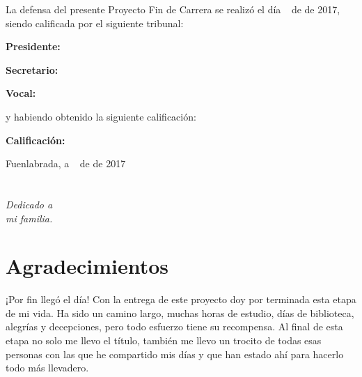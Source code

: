 \documentclass[a4paper, 12pt]{book}
\begin{document}
\vspace{1cm}
La defensa del presente Proyecto Fin de Carrera se realizó el día \qquad$\;\,$ de \qquad\qquad\qquad\qquad \newline de 2017, siendo calificada por el siguiente tribunal:


\vspace{0.5cm}
\textbf{Presidente:}

\vspace{1.2cm}
\textbf{Secretario:}

\vspace{1.2cm}
\textbf{Vocal:}


\vspace{1.2cm}
y habiendo obtenido la siguiente calificación:

\vspace{1cm}
\textbf{Calificación:}


\vspace{1cm}
\begin{flushright}
Fuenlabrada, a \qquad$\;\,$ de \qquad\qquad\qquad\qquad de 2017
\end{flushright}


\chapter*{}
\begin{flushright}
\textit{Dedicado a \\
mi familia.}
\end{flushright}


\chapter*{Agradecimientos}

¡Por fin llegó el día! Con la entrega de este proyecto doy por terminada esta etapa de mi vida. Ha sido un camino largo, muchas horas de estudio, días de biblioteca, alegrías y decepciones, pero todo esfuerzo tiene su recompensa. Al final de esta etapa no solo me llevo el título, también me llevo un trocito de todas esas personas con las que he compartido mis días y que han estado ahí para hacerlo todo más llevadero.
\end{document}

